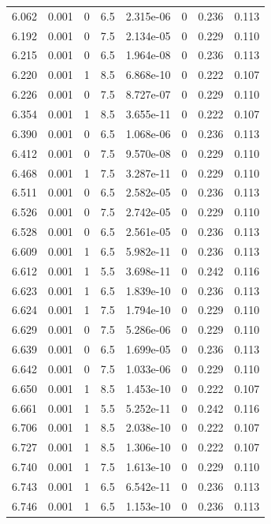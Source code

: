 \documentclass[preview]{standalone}
\begin{document}
{{{{{\begin{tabular}{L{1.2cm}C{1.2cm} C{0.3cm}C{0.5cm} C{1.4cm}C{1.4cm} C{1.4cm}C{1.4cm}}
  6.062  &  0.001  & 0     & 6.5 &  2.315e-06  & 0  & 0.236 &  0.113   \\ 
  6.192  &  0.001  & 0     & 7.5 &  2.134e-05  & 0  & 0.229 &  0.110   \\ 
  6.215  &  0.001  & 0     & 6.5 &  1.964e-08  & 0  & 0.236 &  0.113   \\ 
  6.220  &  0.001  & 1     & 8.5 &  6.868e-10  & 0  & 0.222 &  0.107   \\ 
  6.226  &  0.001  & 0     & 7.5 &  8.727e-07  & 0  & 0.229 &  0.110   \\ 
  6.354  &  0.001  & 1     & 8.5 &  3.655e-11  & 0  & 0.222 &  0.107   \\ 
  6.390  &  0.001  & 0     & 6.5 &  1.068e-06  & 0  & 0.236 &  0.113   \\ 
  6.412  &  0.001  & 0     & 7.5 &  9.570e-08  & 0  & 0.229 &  0.110   \\ 
  6.468  &  0.001  & 1     & 7.5 &  3.287e-11  & 0  & 0.229 &  0.110   \\ 
  6.511  &  0.001  & 0     & 6.5 &  2.582e-05  & 0  & 0.236 &  0.113   \\ 
  6.526  &  0.001  & 0     & 7.5 &  2.742e-05  & 0  & 0.229 &  0.110   \\ 
  6.528  &  0.001  & 0     & 6.5 &  2.561e-05  & 0  & 0.236 &  0.113   \\ 
  6.609  &  0.001  & 1     & 6.5 &  5.982e-11  & 0  & 0.236 &  0.113   \\ 
  6.612  &  0.001  & 1     & 5.5 &  3.698e-11  & 0  & 0.242 &  0.116   \\ 
  6.623  &  0.001  & 1     & 6.5 &  1.839e-10  & 0  & 0.236 &  0.113   \\ 
  6.624  &  0.001  & 1     & 7.5 &  1.794e-10  & 0  & 0.229 &  0.110   \\ 
  6.629  &  0.001  & 0     & 7.5 &  5.286e-06  & 0  & 0.229 &  0.110   \\ 
  6.639  &  0.001  & 0     & 6.5 &  1.699e-05  & 0  & 0.236 &  0.113   \\ 
  6.642  &  0.001  & 0     & 7.5 &  1.033e-06  & 0  & 0.229 &  0.110   \\ 
  6.650  &  0.001  & 1     & 8.5 &  1.453e-10  & 0  & 0.222 &  0.107   \\ 
  6.661  &  0.001  & 1     & 5.5 &  5.252e-11  & 0  & 0.242 &  0.116   \\ 
  6.706  &  0.001  & 1     & 8.5 &  2.038e-10  & 0  & 0.222 &  0.107   \\ 
  6.727  &  0.001  & 1     & 8.5 &  1.306e-10  & 0  & 0.222 &  0.107   \\ 
  6.740  &  0.001  & 1     & 7.5 &  1.613e-10  & 0  & 0.229 &  0.110   \\ 
  6.743  &  0.001  & 1     & 6.5 &  6.542e-11  & 0  & 0.236 &  0.113   \\ 
  6.746  &  0.001  & 1     & 6.5 &  1.153e-10  & 0  & 0.236 &  0.113   \\ 
\hline 
\end{tabular} 

}}}}}
\end{document}
